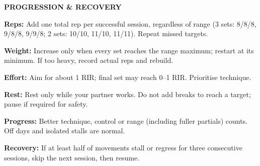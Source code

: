 \documentclass[10pt,a4paper]{article}
\begin{document}
\begin{tcolorbox}[colback=panelbg,colframe=grid,boxrule=0.5pt,arc=1.5mm,left=2mm,right=2mm,top=1mm,bottom=1mm,boxsep=0pt,before skip=0pt,after skip=0pt]
\textbf{PROGRESSION \& RECOVERY}\par\vspace{0.6mm}
\begin{minipage}[t]{0.485\linewidth}\raggedright
\textbf{Reps:} Add one total rep per successful session, regardless of range (3 sets: 8/8/8, 9/8/8, 9/9/8; 2 sets: 10/10, 11/10, 11/11). Repeat missed targets.\par
\textbf{Weight:} Increase only when every set reaches the range maximum; restart at its minimum. If too heavy, record actual reps and rebuild.\par
\textbf{Effort:} Aim for about 1 RIR; final set may reach 0--1 RIR. Prioritise technique.
\end{minipage}\hfill\begin{minipage}[t]{0.485\linewidth}\raggedright
\textbf{Rest:} Rest only while your partner works. Do not add breaks to reach a target; pause if required for safety.\par
\textbf{Progress:} Better technique, control or range (including fuller partials) counts. Off days and isolated stalls are normal.\par
\textbf{Recovery:} If at least half of movements stall or regress for three consecutive sessions, skip the next session, then resume.
\end{minipage}
\end{tcolorbox}
\end{document}
